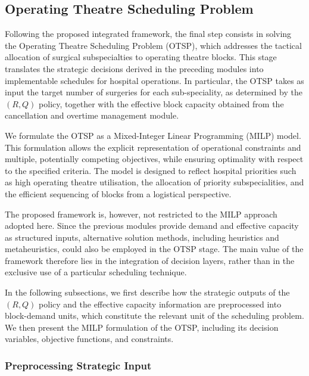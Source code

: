 \subsection{Operating Theatre Scheduling Problem\label{sec:ot}}

Following the proposed integrated framework, the final step consists in solving the Operating Theatre Scheduling Problem (OTSP), which addresses the tactical allocation of surgical subspecialties to operating theatre blocks. 
This stage translates the strategic decisions derived in the preceding modules into implementable schedules for hospital operations. 
In particular, the OTSP takes as input the target number of surgeries for each sub-speciality, as determined by the $(R,Q)$ policy, together with the effective block capacity obtained from the cancellation and overtime management module.

We formulate the OTSP as a Mixed-Integer Linear Programming (MILP) model. This formulation allows the explicit representation of operational constraints and multiple, potentially competing objectives, while ensuring optimality with respect to the specified criteria. 
The model is designed to reflect hospital priorities such as high operating theatre utilisation, the allocation of priority subspecialities, and the efficient sequencing of blocks from a logistical perspective.

The proposed framework is, however, not restricted to the MILP approach adopted here. 
Since the previous modules provide demand and effective capacity as structured inputs, alternative solution methods, including heuristics and metaheuristics, could also be employed in the OTSP stage.
The main value of the framework therefore lies in the integration of decision layers, rather than in the exclusive use of a particular scheduling technique.

In the following subsections, we first describe how the strategic outputs of the $(R,Q)$ policy and the effective capacity information are preprocessed into block-demand units, which constitute the relevant unit of the scheduling problem. 
We then present the MILP formulation of the OTSP, including its decision variables, objective functions, and constraints.

\subsubsection{Preprocessing Strategic Input\label{subsec:preprocess_otsp}}

